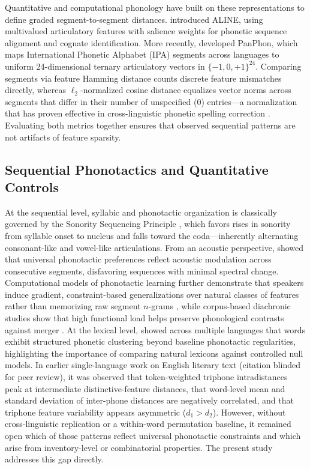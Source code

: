 \documentclass{interact}
\begin{document}
Quantitative and computational phonology have built on these representations to define graded segment-to-segment distances. \citet{kondrak2003} introduced ALINE, using multivalued articulatory features with salience weights for phonetic sequence alignment and cognate identification. More recently, \citet{mortensen2016panphon} developed PanPhon, which maps International Phonetic Alphabet (IPA) segments across languages to uniform 24-dimensional ternary articulatory vectors in $\{-1, 0, +1\}^{24}$. Comparing segments via feature Hamming distance counts discrete feature mismatches directly, whereas $\ell_2$-normalized cosine distance equalizes vector norms across segments that differ in their number of unspecified ($0$) entries---a normalization that has proven effective in cross-linguistic phonetic spelling correction \citep{mortensen2016panphon}. Evaluating both metrics together ensures that observed sequential patterns are not artifacts of feature sparsity.

\subsection{Sequential Phonotactics and Quantitative Controls}
At the sequential level, syllabic and phonotactic organization is classically governed by the Sonority Sequencing Principle \citep{clements1990}, which favors rises in sonority from syllable onset to nucleus and falls toward the coda---inherently alternating consonant-like and vowel-like articulations. From an acoustic perspective, \citet{kawasakifukumori1992} showed that universal phonotactic preferences reflect acoustic modulation across consecutive segments, disfavoring sequences with minimal spectral change. Computational models of phonotactic learning further demonstrate that speakers induce gradient, constraint-based generalizations over natural classes of features rather than memorizing raw segment $n$-grams \citep{hayes2008}, while corpus-based diachronic studies show that high functional load helps preserve phonological contrasts against merger \citep{wedel2013}. At the lexical level, \citet{dautriche2017} showed across multiple languages that words exhibit structured phonetic clustering beyond baseline phonotactic regularities, highlighting the importance of comparing natural lexicons against controlled null models. In earlier single-language work on English literary text (citation blinded for peer review), it was observed that token-weighted triphone intradistances peak at intermediate distinctive-feature distances, that word-level mean and standard deviation of inter-phone distances are negatively correlated, and that triphone feature variability appears asymmetric ($d_1 > d_2$). However, without cross-linguistic replication or a within-word permutation baseline, it remained open which of those patterns reflect universal phonotactic constraints and which arise from inventory-level or combinatorial properties. The present study addresses this gap directly.
\end{document}
